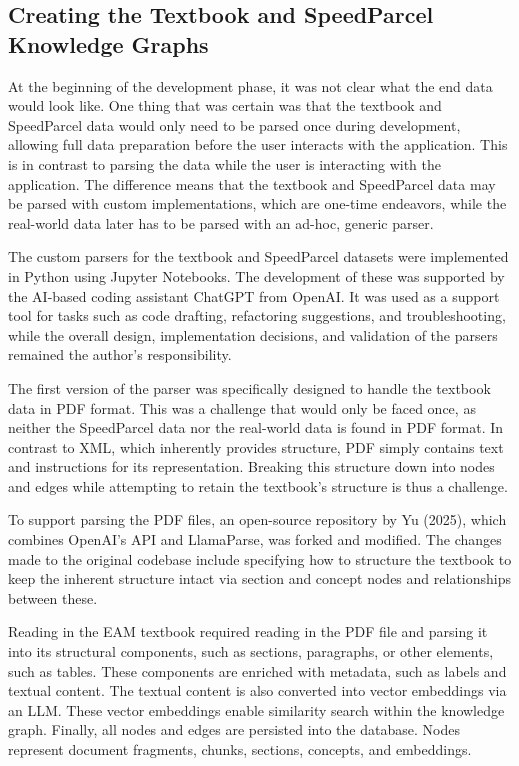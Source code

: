 \subsection{Creating the Textbook and SpeedParcel  Knowledge Graphs}
\label{sub:data_used}
At the beginning of the development phase, it was not clear what the end data would look like. One thing that was certain was that the textbook and SpeedParcel data would only need to be parsed once during development, allowing full data preparation before the user interacts with the application. This is in contrast to parsing the data while the user is interacting with the application. The difference means that the textbook and SpeedParcel data may be parsed with custom implementations, which are one-time endeavors, while the real-world data later has to be parsed with an ad-hoc, generic parser.

The custom parsers for the textbook and SpeedParcel datasets were implemented in Python using Jupyter Notebooks. The development of these was supported by the AI-based coding assistant ChatGPT from OpenAI. It was used as a support tool for tasks such as code drafting, refactoring suggestions, and troubleshooting, while the overall design, implementation decisions, and validation of the parsers remained the author's responsibility.

The first version of the parser was specifically designed to handle the textbook data in PDF format. This was a challenge that would only be faced once, as neither the SpeedParcel data nor the real-world data is found in PDF format. In contrast to XML, which inherently provides structure, PDF simply contains text and instructions for its representation. \cite{llamaindex_llamaparse_2025} Breaking this structure down into nodes and edges while attempting to retain the textbook's structure is thus a challenge.

To support parsing the PDF files, an open-source repository by Yu (2025), which combines OpenAI's API and LlamaParse, was forked and modified. \cite{yu_graph_rag_2025} The changes made to the original codebase include specifying how to structure the textbook to keep the inherent structure intact via section and concept nodes and relationships between these.

Reading in the EAM textbook required reading in the PDF file and parsing it into its structural components, such as sections, paragraphs, or other elements, such as tables. These components are enriched with metadata, such as labels and textual content. The textual content is also converted into vector embeddings via an LLM. These vector embeddings enable similarity search within the knowledge graph. Finally, all nodes and edges are persisted into the database. Nodes represent document fragments, chunks, sections, concepts, and embeddings.


